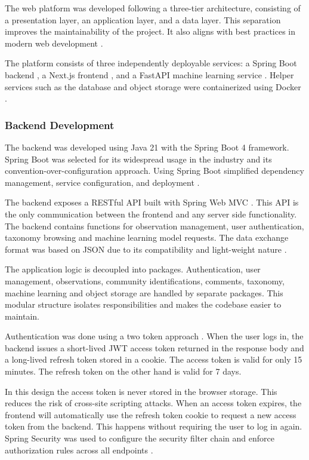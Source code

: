 The web platform was developed following a three-tier architecture, 
consisting of a presentation layer, an application layer, and a data layer. 
This separation improves the maintainability of the project. It also aligns 
with best practices in modern web development \cite{cervantes2024software}. 

The platform consists of three independently deployable services: a Spring Boot backend \cite{springboot2025}, 
a Next.js frontend \cite{nextjs2025}, and a FastAPI machine learning service \cite{fastapi2025}. Helper services such as  
the database and object storage were containerized using Docker \cite{docker2025}.

\subsubsection{Backend Development}

The backend was developed using Java 21 \cite{oraclejava2025} with the Spring Boot 4 framework. Spring Boot 
was selected for its widespread usage in the industry and its convention-over-configuration
approach. Using Spring Boot simplified dependency management, service configuration, and 
deployment \cite{springboot2025}.

The backend exposes a RESTful API built with Spring Web MVC \cite{walls2022spring}. 
This API is the only communication between the frontend and any server side functionality.
The backend contains functions for observation management, user authentication, taxonomy browsing and machine learning model requests.
The data exchange format was based on JSON due to its compatibility and light-weight nature \cite{bray2017json}.

The application logic is decoupled into packages. Authentication, user management, observations, community identifications, comments, taxonomy, machine learning and object storage are handled by separate packages. 
This modular structure isolates responsibilities and makes the codebase easier to maintain.

Authentication was done using a two token approach \cite{rfc7519jwt}. When the user logs in, the backend issues a short-lived JWT access token returned in the response body and a long-lived refresh token stored in a cookie. 
The access token is valid for only 15 minutes. The refresh token on the other hand is valid for 7 days.

In this design the access token is never stored in the browser storage. 
This reduces the risk of cross-site scripting attacks. 
When an access token expires, the frontend will automatically use the refresh token cookie to request a new access token from the backend.
This happens without requiring the user to log in again. 
Spring Security was used to configure the security filter chain and enforce 
authorization rules across all endpoints \cite{manne2023springsecurity}.

